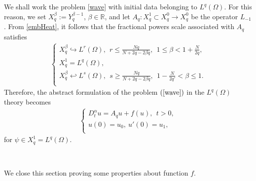 \documentclass[12pt,reqno]{amsart}
\newcommand{\R}{\mathbb{R}}	%
\begin{document}
We shall work the problem \eqref{wave} with initial data belonging to $L^q(\Omega)$. For this reason, we set $X_{q}^{\beta}:=Y_{q}^{\beta-1}$, $\beta\in\R$, and let $A_q: X_{q}^{1}\subset X_{q}^{0}\rightarrow X_{q}^{0}$ be  the operator $L_{-1}$. From \eqref{embHeat}, it follows that the fractional powers scale associated with $A_q$ satisfies 
\begin{eqnarray}\label{IS}
	\left\{\begin{array}{lrc}
		X_{q}^{\beta}\hookrightarrow L^r(\Omega), \ \ r\leq \frac{Nq}{N+2q-2\beta q}, \ \ 1\leq\beta<1+\frac{N}{2q},\\
		X_{q}^{1}=L^q(\Omega),\\
		X_{q}^{\beta}\hookleftarrow L^s(\Omega), \ \ s\geq \frac{Nq}{N+2q-2\beta q}, \ \ 1-\frac{N}{2q'}<\beta\leq 1.\\
	\end{array}\right.
\end{eqnarray}
Therefore, the abstract formulation of the problem $(\ref{wave})$ in the $L^q(\Omega)$ theory becomes  
\begin{eqnarray} \label{awave}
	\left\{\begin{array}{lrr}
		D^{\alpha}_{t}u=A_qu + f(u),\ \ t>0,\\
		u(0)=u_0, \ u'(0)=u_1,\\
	\end{array} \right.
\end{eqnarray}
for $\psi\in X_{q}^{1}=L^{q}(\Omega)$.
			
			\
			
We close this section proving some properties about function  $f$.
			
\end{document}
